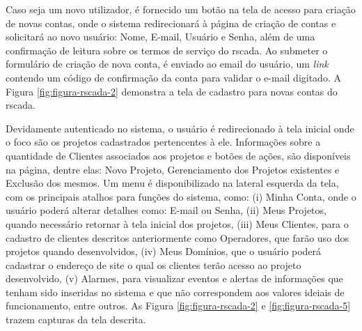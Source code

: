 Caso seja um novo utilizador, é fornecido um botão na tela de acesso para criação de novas contas, onde o sistema redirecionará à página de criação de contas e solicitará ao novo usuário: Nome, E-mail, Usuário e Senha, além de uma confirmação de leitura sobre os termos de serviço do rscada. Ao submeter o formulário de criação de nova conta, é enviado ao email do usuário, um \textit{link} contendo um código de confirmação da conta para validar o e-mail digitado. A Figura \ref{fig:figura-rscada-2} demonstra a tela de cadastro para novas contas do rscada.

        \begin{figure}[!h]
    	\end{figure}

Devidamente autenticado no sistema, o usuário é redirecionado à tela inicial onde o foco são os projetos cadastrados pertencentes à ele. Informações sobre a quantidade de Clientes associados aos projetos e botões de ações, são disponíveis na página, dentre elas: Novo Projeto, Gerenciamento dos Projetos existentes e Exclusão dos mesmos. Um menu é disponibilizado na lateral esquerda da tela, com os principais atalhos para funções do sistema, como: (i) Minha Conta, onde o usuário poderá alterar detalhes como: E-mail ou Senha, (ii) Meus Projetos, quando necessário retornar à tela inicial dos projetos, (iii) Meus Clientes, para o cadastro de clientes descritos anteriormente como Operadores, que farão uso dos projetos quando desenvolvidos, (iv) Meus Domínios, que o usuário poderá cadastrar o endereço de site o qual os clientes terão acesso ao projeto desenvolvido, (v) Alarmes, para visualizar eventos e alertas de informações que tenham sido inseridas no sistema e que não correspondem aos valores ideiais de funcionamento, entre outros. As Figura \ref{fig:figura-rscada-2} e \ref{fig:figura-rscada-5} trazem capturas da tela descrita.


